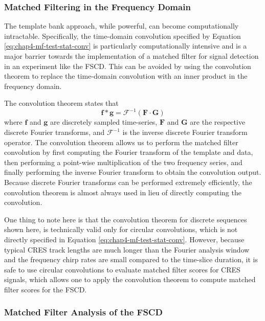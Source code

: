 \subsubsection*{Matched Filtering in the Frequency Domain}

The template bank approach, while powerful, can become computationally intractable. Specifically, the time-domain convolution specified by Equation \ref{eq:chap4-mf-test-stat-conv} is particularly computationally intensive and is a major barrier towards the implementation of a matched filter for signal detection in an experiment like the FSCD. This can be avoided by using the convolution theorem to replace the time-domain convolution with an inner product in the frequency domain. 

The convolution theorem states that 
\begin{equation}
    \bm{f}\ast\bm{g} = \mathcal{F}^{-1}\left(\bm{F}\cdot \bm{G}\right)
    \label{eq:chap4-conv-theorem}
\end{equation}
where $\bm{f}$ and $\bm{g}$ are discretely sampled time-series, $\bm{F}$ and $\bm{G}$ are the respective discrete Fourier transforms, and $\mathcal{F}^{-1}$ is the inverse discrete Fourier transform operator. The convolution theorem allows us to perform the matched filter convolution by first computing the Fourier transform of the template and data, then performing a point-wise multiplication of the two frequency series, and finally performing the inverse Fourier transform to obtain the convolution output. Because discrete Fourier transforms can be performed extremely efficiently, the convolution theorem is almost always used in lieu of directly computing the convolution. 

One thing to note here is that the convolution theorem for discrete sequences shown here, is technically valid only for circular convolutions, which is not directly specified in Equation \ref{eq:chap4-mf-test-stat-conv}. However, because typical CRES track lengths are much longer than the Fourier analysis window and the frequency chirp rates are small compared to the time-slice duration, it is safe to use circular convolutions to evaluate matched filter scores for CRES signals, which allows one to apply the convolution theorem to compute matched filter scores for the FSCD.

\subsubsection*{Matched Filter Analysis of the FSCD}

